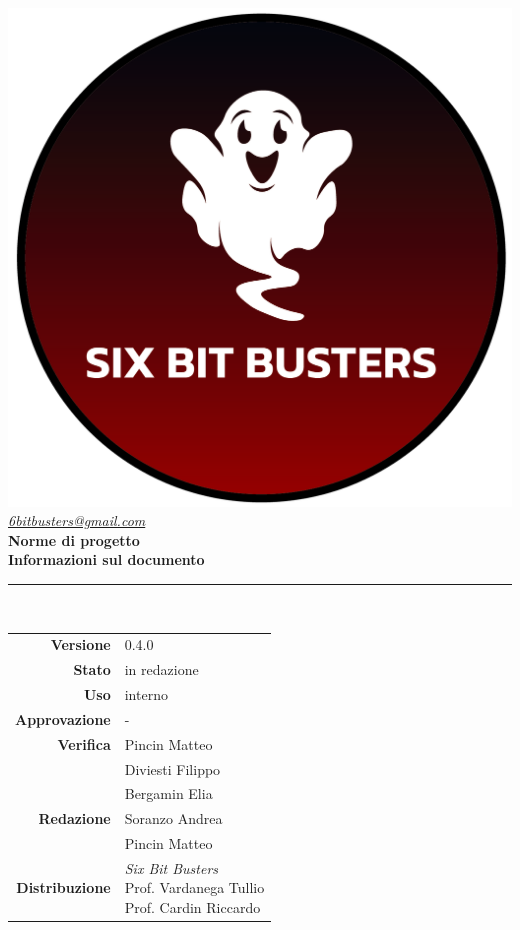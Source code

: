 \thispagestyle{empty}
\renewcommand{\arraystretch}{1.3}


\begin{titlepage}
	\begin{center}
		
	\includegraphics[scale = 0.7]{template/images/logo-circle.png}
	\\[1cm]
	\href{mailto:6bitbusters@gmail.com}		      	
	{\large{\textit{6bitbusters@gmail.com} } }\\[1cm]
	
	\Huge \textbf{Norme di progetto} \\[1cm]

	\large \textbf{Informazioni sul documento} \\
	\rule{0.6\textwidth}{0.4pt}
	\\[0.5cm]
	\begin{tabular}{r|l}
		\textbf{Versione} & 0.4.0\\
		\textbf{Stato} & in redazione\\
		\textbf{Uso} & interno\\                         
		\textbf{Approvazione} & -\\                      
		\textbf{Verifica} & Pincin Matteo \\ & Diviesti Filippo \\ & Bergamin Elia \\                        
		\textbf{Redazione} & Soranzo Andrea\\ & Pincin Matteo \\
		\textbf{Distribuzione} & \parbox[t]{5cm}{ \textit{Six Bit Busters} \\ Prof. Vardanega Tullio 
	 \\ Prof. Cardin Riccardo}
	\end{tabular}	
	\\[1.2cm]


\end{center}
\end{titlepage}
